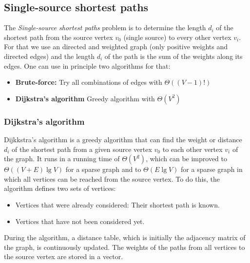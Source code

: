 %

\subsection{Single-source shortest paths}

The \emph{Single-source shortest paths} problem is to determine the length $d_i$ of the shortest path from the source vertex $v_0$ (single source) to every other vertex $v_i$. For that we use an directed and weighted graph (only positive weights and directed edges) and the length $d_i$ of the path is the sum of the weights along its edges. One can use in principle two algorithms for that:

\begin{itemize}
    \item \textbf{Brute-force:} Try all combinations of edges with $\Theta((V-1)!)$
    \item \textbf{Dijkstra's algorithm} Greedy algorithm with $\Theta(V^2)$
\end{itemize}

\subsubsection{Dijkstra's algorithm}

Dijkkstra's algorithm is a greedy algorithm that can find the weight or distance $d_i$ of the shortest path from a given source vertex 
$v_0$ to each other vertex $v_i$ of the graph. It runs in a running time of $\Theta(V^2)$, which can be improved to $\Theta((V+E)\lg V)$ for a sparse graph and to $\Theta(E\lg V)$ for a sparse graph in which all vertices can be reached from the source vertex. To do this, the algorithm defines two sets of vertices:

\begin{itemize}
    \item Vertices that were already considered: Their shortest path is known.
    \item Vertices that have not been considered yet. 
\end{itemize}

During the algorithm, a distance table, which is initially the adjacency matrix of the graph, is continuously updated. The weights of the paths from all vertices to the source vertex are stored in a vector.

